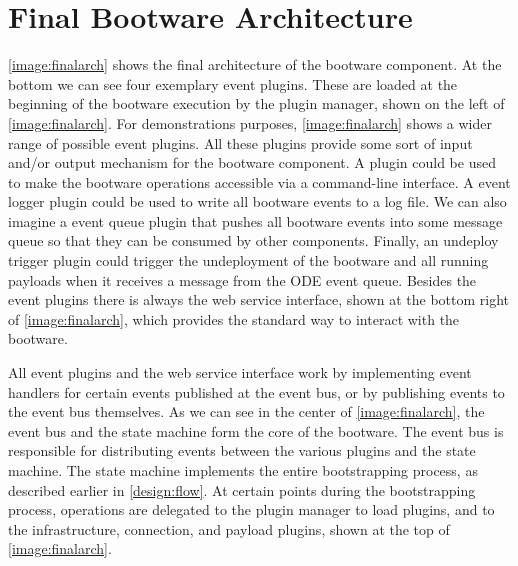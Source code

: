 \section{Final Bootware Architecture}
\label{design:finalarch}

\autoref{image:finalarch} shows the final architecture of the bootware component.
At the bottom we can see four exemplary event plugins.
These are loaded at the beginning of the bootware execution by the plugin manager, shown on the left of \autoref{image:finalarch}.
For demonstrations purposes, \autoref{image:finalarch} shows a wider range of possible event plugins.
All these plugins provide some sort of input and/or output mechanism for the bootware component.
A  plugin could be used to make the bootware operations accessible via a command-line interface.
A event logger plugin could be used to write all bootware events to a log file.
We can also imagine a event queue plugin that pushes all bootware events into some message queue so that they can be consumed by other components.
Finally, an undeploy trigger plugin could trigger the undeployment of the bootware and all running payloads when it receives a message from the ODE event queue.
Besides the event plugins there is always the web service interface, shown at the bottom right of \autoref{image:finalarch}, which provides the standard way to interact with the bootware.

All event plugins and the web service interface work by implementing event handlers for certain events published at the event bus, or by publishing events to the event bus themselves.
As we can see in the center of \autoref{image:finalarch}, the event bus and the state machine form the core of the bootware.
The event bus is responsible for distributing events between the various plugins and the state machine.
The state machine implements the entire bootstrapping process, as described earlier in \autoref{design:flow}.
At certain points during the bootstrapping process, operations are delegated to the plugin manager to load plugins, and to the infrastructure, connection, and payload plugins, shown at the top of \autoref{image:finalarch}.

